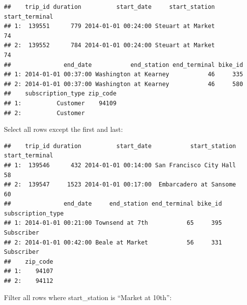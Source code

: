 \documentclass[]{book}
\newenvironment{Shaded}{\begin{snugshade}}{\end{snugshade}}
\newcommand{\CommentTok}[1]{\textcolor[rgb]{0.56,0.35,0.01}{\textit{#1}}}
\newcommand{\DecValTok}[1]{\textcolor[rgb]{0.00,0.00,0.81}{#1}}
\newcommand{\KeywordTok}[1]{\textcolor[rgb]{0.13,0.29,0.53}{\textbf{#1}}}
\newcommand{\NormalTok}[1]{#1}
\newcommand{\OperatorTok}[1]{\textcolor[rgb]{0.81,0.36,0.00}{\textbf{#1}}}
\newcommand{\StringTok}[1]{\textcolor[rgb]{0.31,0.60,0.02}{#1}}
\begin{document}
\begin{verbatim}
##    trip_id duration          start_date     start_station start_terminal
## 1:  139551      779 2014-01-01 00:24:00 Steuart at Market             74
## 2:  139552      784 2014-01-01 00:24:00 Steuart at Market             74
##               end_date           end_station end_terminal bike_id
## 1: 2014-01-01 00:37:00 Washington at Kearney           46     335
## 2: 2014-01-01 00:37:00 Washington at Kearney           46     580
##    subscription_type zip_code
## 1:          Customer    94109
## 2:          Customer
\end{verbatim}

Select all rows except the first and last:

\begin{Shaded}
\end{Shaded}

\begin{verbatim}
##    trip_id duration          start_date           start_station start_terminal
## 1:  139546      432 2014-01-01 00:14:00 San Francisco City Hall             58
## 2:  139547     1523 2014-01-01 00:17:00  Embarcadero at Sansome             60
##               end_date     end_station end_terminal bike_id subscription_type
## 1: 2014-01-01 00:21:00 Townsend at 7th           65     395        Subscriber
## 2: 2014-01-01 00:42:00 Beale at Market           56     331        Subscriber
##    zip_code
## 1:    94107
## 2:    94112
\end{verbatim}

Filter all rows where start\_station is ``Market at 10th'':

\begin{Shaded}
\end{Shaded}
\end{document}
